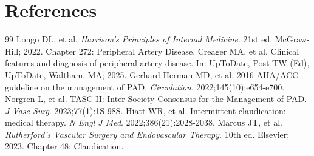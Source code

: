 \section*{References}

\begin{thebibliography}{99}
 Longo DL, et al. \emph{Harrison's Principles of Internal Medicine}. 21st ed. McGraw-Hill; 2022. Chapter 272: Peripheral Artery Disease.
 Creager MA, et al. Clinical features and diagnosis of peripheral artery disease. In: UpToDate, Post TW (Ed), UpToDate, Waltham, MA; 2025.
 Gerhard-Herman MD, et al. 2016 AHA/ACC guideline on the management of PAD. \emph{Circulation}. 2022;145(10):e654-e700.
 Norgren L, et al. TASC II: Inter-Society Consensus for the Management of PAD. \emph{J Vasc Surg}. 2023;77(1):1S-98S.
 Hiatt WR, et al. Intermittent claudication: medical therapy. \emph{N Engl J Med}. 2022;386(21):2028-2038.
 Marcus JT, et al. \emph{Rutherford's Vascular Surgery and Endovascular Therapy}. 10th ed. Elsevier; 2023. Chapter 48: Claudication.
\end{thebibliography}
